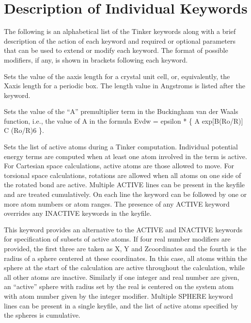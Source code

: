 \documentclass[letterpaper,11pt,english]{sphinxmanual}
\begin{document}
\section{Description of Individual Keywords}
\label{\detokenize{text/keywords:description-of-individual-keywords}}
The following is an alphabetical list of the Tinker keywords along with a brief description of the action of each keyword and required or optional parameters that can be used to extend or modify each keyword. The format of possible modifiers, if any, is shown in brackets following each keyword.

  Sets the value of the a\sphinxhyphen{}axis length for a crystal unit cell, or, equivalently, the X\sphinxhyphen{}axis length for a periodic box. The length value in Angstroms is listed after the keyword.

  Sets the value of the “A” premultiplier term in the Buckingham van der Waals function, i.e., the value of A in the formula Evdw = epsilon * \{ A exp{[}\sphinxhyphen{}B(Ro/R){]} \sphinxhyphen{} C (Ro/R)6 \}.

  Sets the list of active atoms during a Tinker computation. Individual potential energy terms are computed when at least one atom involved in the term is active. For Cartesian space calculations, active atoms are those allowed to move. For torsional space calculations, rotations are allowed when all atoms on one side of the rotated bond are active. Multiple ACTIVE lines can be present in the keyfile and are treated cumulatively.  On each line the keyword can be followed by one or more atom numbers or atom ranges. The presence of any ACTIVE keyword overrides any INACTIVE keywords in the keyfile.

  This keyword provides an alternative to the ACTIVE and INACTIVE keywords for specification of subsets of active atoms. If four real number modifiers are provided, the first three are taken as X\sphinxhyphen{}, Y\sphinxhyphen{} and Z\sphinxhyphen{}coordinates and the fourth is the radius of a sphere centered at these coordinates. In this case, all atoms within the sphere at the start of the calculation are active throughout the calculation, while all other atoms are inactive. Similarly if one integer and real number are given, an “active” sphere with radius set by the real is centered on the system atom with atom number given by the integer modifier. Multiple SPHERE keyword lines can be present in a single keyfile, and the list of active atoms specified by the spheres is cumulative.
\end{document}
